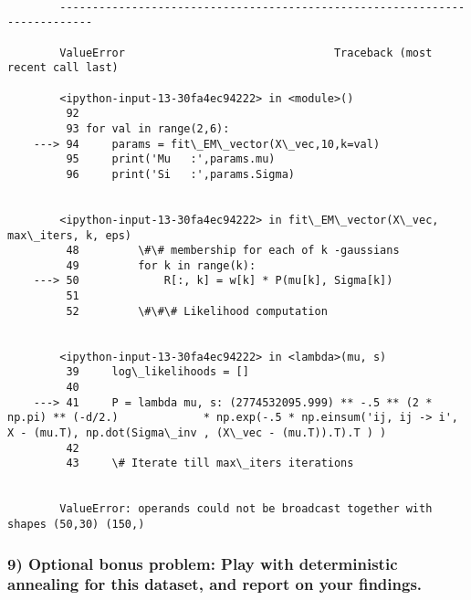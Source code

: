\documentclass[11pt]{article}
\begin{document}
    \begin{Verbatim}[commandchars=\\\{\}]

        ---------------------------------------------------------------------------

        ValueError                                Traceback (most recent call last)

        <ipython-input-13-30fa4ec94222> in <module>()
         92 
         93 for val in range(2,6):
    ---> 94     params = fit\_EM\_vector(X\_vec,10,k=val)
         95     print('Mu   :',params.mu)
         96     print('Si   :',params.Sigma)
    

        <ipython-input-13-30fa4ec94222> in fit\_EM\_vector(X\_vec, max\_iters, k, eps)
         48         \#\# membership for each of k -gaussians
         49         for k in range(k):
    ---> 50             R[:, k] = w[k] * P(mu[k], Sigma[k])
         51 
         52         \#\#\# Likelihood computation
    

        <ipython-input-13-30fa4ec94222> in <lambda>(mu, s)
         39     log\_likelihoods = []
         40 
    ---> 41     P = lambda mu, s: (2774532095.999) ** -.5 ** (2 * np.pi) ** (-d/2.)             * np.exp(-.5 * np.einsum('ij, ij -> i',                    X - (mu.T), np.dot(Sigma\_inv , (X\_vec - (mu.T)).T).T ) )
         42 
         43     \# Iterate till max\_iters iterations
    

        ValueError: operands could not be broadcast together with shapes (50,30) (150,) 

    \end{Verbatim}

    \subsubsection{9) Optional bonus problem: Play with deterministic
annealing for this dataset, and report on your
findings.}\label{optional-bonus-problem-play-with-deterministic-annealing-for-this-dataset-and-report-on-your-findings.}


    
    
    
    
\end{document}
